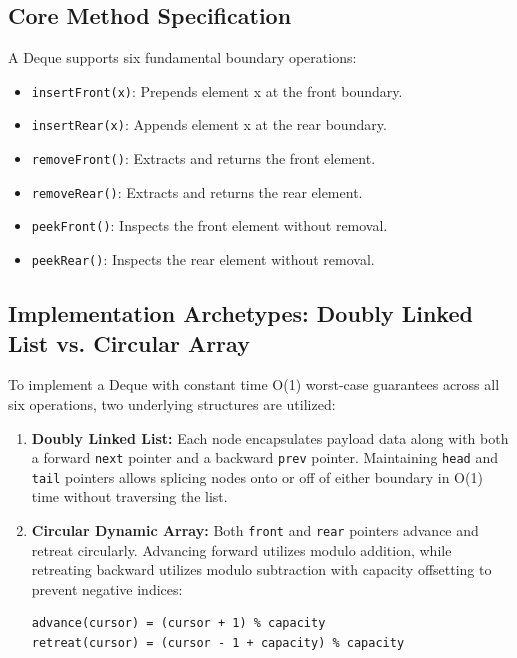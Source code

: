 \documentclass[10pt,journal,compsoc,onecolumn]{IEEEtran}
\begin{document}
\subsection{Core Method Specification}

A Deque supports six fundamental boundary operations:
\begin{itemize}
    \item \texttt{insertFront(x)}: Prepends element x at the front boundary.
    \item \texttt{insertRear(x)}: Appends element x at the rear boundary.
    \item \texttt{removeFront()}: Extracts and returns the front element.
    \item \texttt{removeRear()}: Extracts and returns the rear element.
    \item \texttt{peekFront()}: Inspects the front element without removal.
    \item \texttt{peekRear()}: Inspects the rear element without removal.
\end{itemize}

\subsection{Implementation Archetypes: Doubly Linked List vs. Circular Array}

To implement a Deque with constant time O(1) worst-case guarantees across all six operations, two underlying structures are utilized:
\begin{enumerate}
    \item \textbf{Doubly Linked List:} Each node encapsulates payload data along with both a forward \texttt{next} pointer and a backward \texttt{prev} pointer. Maintaining \texttt{head} and \texttt{tail} pointers allows splicing nodes onto or off of either boundary in O(1) time without traversing the list.
    \item \textbf{Circular Dynamic Array:} Both \texttt{front} and \texttt{rear} pointers advance and retreat circularly. Advancing forward utilizes modulo addition, while retreating backward utilizes modulo subtraction with capacity offsetting to prevent negative indices:
\begin{verbatim}
advance(cursor) = (cursor + 1) % capacity
retreat(cursor) = (cursor - 1 + capacity) % capacity
\end{verbatim}
\end{enumerate}
\end{document}
